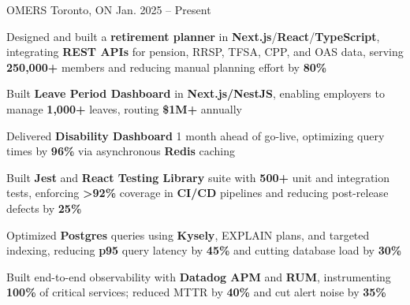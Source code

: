 \documentclass[11pt, a4paper]{awesome-cv}
\begin{document}
\makecvheader[C]


\begin{cventries}


  \cventry
    {\color{lightblue}{ASSOCIATE FULL-STACK ENGINEER}}
    {OMERS}
    {Toronto, ON}
    {Jan. 2025 -- Present}
    {
      \begin{cvitems}
        \item{Designed and built a \textbf{retirement planner} in \textbf{Next.js}/\textbf{React}/\textbf{TypeScript}, integrating \textbf{REST APIs} for pension, RRSP, TFSA, CPP, and OAS data, serving \textbf{250,000+} members and reducing manual planning effort by \textbf{80\%}}
        \item{Built \textbf{Leave Period Dashboard} in \textbf{Next.js/NestJS}, enabling employers to manage \textbf{1,000+} leaves, routing \textbf{\$1M+} annually}
        \item{Delivered \textbf{Disability Dashboard} 1 month ahead of go-live, optimizing query times by \textbf{96\%} via asynchronous \textbf{Redis} caching}
        \item{Built \textbf{Jest} and \textbf{React Testing Library} suite with \textbf{500+} unit and integration tests, enforcing \textbf{>92\%} coverage in \textbf{CI/CD} pipelines and reducing post-release defects by \textbf{25\%}}
        \item{Optimized \textbf{Postgres} queries using \textbf{Kysely}, EXPLAIN plans, and targeted indexing, reducing \textbf{p95} query latency by \textbf{45\%} and cutting database load by \textbf{30\%}}
        \item{Built end-to-end observability with \textbf{Datadog APM} and \textbf{RUM}, instrumenting \textbf{100\%} of critical services; reduced MTTR by \textbf{40\%} and cut alert noise by \textbf{35\%}}
      \end{cvitems}
    }

  \vspace{3mm}


\end{cventries}
\end{document}
